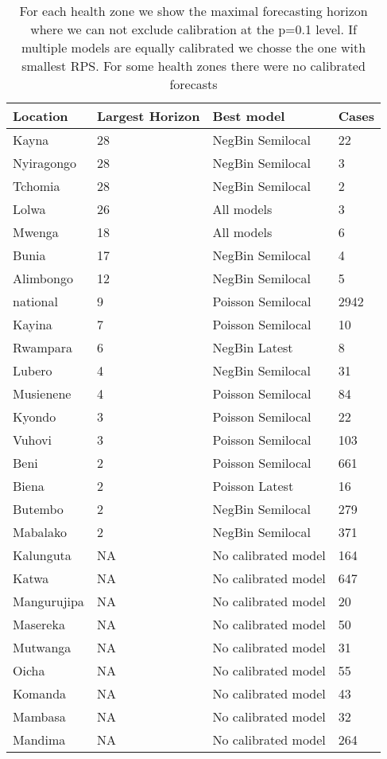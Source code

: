 \begin{table}[h!]
\centering
\begin{tabular}{|l|l|l|l|}
  \hline
Location & Largest Horizon & Best model & Cases \\ 
  \hline
Kayna & 28 & NegBin Semilocal & 22 \\ 
  Nyiragongo & 28 & NegBin Semilocal & 3 \\ 
  Tchomia & 28 & NegBin Semilocal & 2 \\ 
  Lolwa & 26 & All models & 3 \\ 
  Mwenga & 18 & All models & 6 \\ 
  Bunia & 17 & NegBin Semilocal & 4 \\ 
  Alimbongo & 12 & NegBin Semilocal & 5 \\ 
  national & 9 & Poisson Semilocal & 2942 \\ 
  Kayina & 7 & Poisson Semilocal & 10 \\ 
  Rwampara & 6 & NegBin Latest & 8 \\ 
  Lubero & 4 & NegBin Semilocal & 31 \\ 
  Musienene & 4 & Poisson Semilocal & 84 \\ 
  Kyondo & 3 & Poisson Semilocal & 22 \\ 
  Vuhovi & 3 & Poisson Semilocal & 103 \\ 
  Beni & 2 & Poisson Semilocal & 661 \\ 
  Biena & 2 & Poisson Latest & 16 \\ 
  Butembo & 2 & NegBin Semilocal & 279 \\ 
  Mabalako & 2 & NegBin Semilocal & 371 \\ 
  Kalunguta & NA & No calibrated model & 164 \\ 
  Katwa & NA & No calibrated model & 647 \\ 
  Mangurujipa & NA & No calibrated model & 20 \\ 
  Masereka & NA & No calibrated model & 50 \\ 
  Mutwanga & NA & No calibrated model & 31 \\ 
  Oicha & NA & No calibrated model & 55 \\ 
  Komanda & NA & No calibrated model & 43 \\ 
  Mambasa & NA & No calibrated model & 32 \\ 
  Mandima & NA & No calibrated model & 264 \\ 
   \hline
\end{tabular}
\caption{For each health zone we show the maximal forecasting horizon where we can not exclude calibration at the p=0.1 level. If multiple models are equally calibrated we chosse the one with smallest RPS. For some health zones there were no calibrated forecasts} 
\label{tab:best_model}
\end{table}
